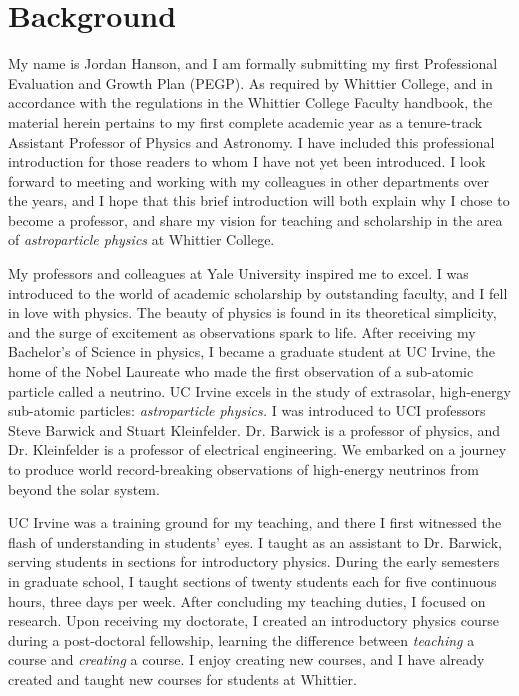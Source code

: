 \documentclass[../../main.tex]{subfiles}
\begin{document}
\section{Background}

My name is Jordan Hanson, and I am formally submitting my first Professional Evaluation and Growth Plan (PEGP).  As required by Whittier College, and in accordance with the regulations in the Whittier College Faculty handbook, the material herein pertains to my first complete academic year as a tenure-track Assistant Professor of Physics and Astronomy.  I have included this professional introduction for those readers to whom I have not yet been introduced.  I look forward to meeting and working with my colleagues in other departments over the years, and I hope that this brief introduction will both explain why I chose to become a professor, and share my vision for teaching and scholarship in the area of \textit{astroparticle physics} at Whittier College. \\ \hspace{0.1cm}

My professors and colleagues at Yale University inspired me to excel.  I was introduced to the world of academic scholarship by outstanding faculty, and I fell in love with physics.  The beauty of physics is found in its theoretical simplicity, and the surge of excitement as observations spark to life.  After receiving my Bachelor's of Science in physics, I became a graduate student at UC Irvine, the home of the Nobel Laureate who made the first observation of a sub-atomic particle called a neutrino.  UC Irvine excels in the study of extrasolar, high-energy sub-atomic particles: \textit{astroparticle physics.}  I was introduced to UCI professors Steve Barwick and Stuart Kleinfelder.  Dr. Barwick is a professor of physics, and Dr. Kleinfelder is a professor of electrical engineering.  We embarked on a journey to produce world record-breaking observations of high-energy neutrinos from beyond the solar system. \\ \hspace{0.1cm}

UC Irvine was a training ground for my teaching, and there I first witnessed the flash of understanding in students' eyes.  I taught as an assistant to Dr. Barwick, serving students in sections for introductory physics.  During the early semesters in graduate school, I taught sections of twenty students each for five continuous hours, three days per week.  After concluding my teaching duties, I focused on research.  Upon receiving my doctorate, I created an introductory physics course during a post-doctoral fellowship, learning the difference between \textit{teaching} a course and \textit{creating} a course.  I enjoy creating new courses, and I have already created and taught new courses for students at Whittier.
\end{document}
